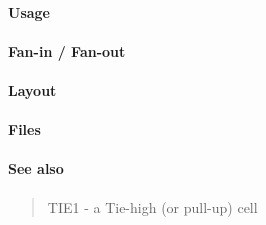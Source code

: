 \paragraph{Usage}

\paragraph{Fan-in / Fan-out}

\paragraph{Layout}

\paragraph{Files}

\paragraph{See also}
\begin{quote}
    TIE1 - a Tie-high (or pull-up) cell
\end{quote}
